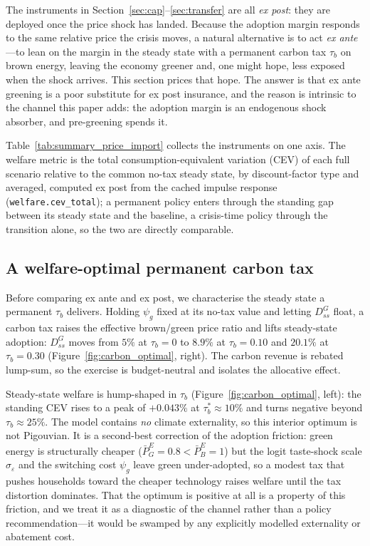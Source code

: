 \documentclass[11pt,a4paper]{article}
\begin{document}
The instruments in Section~\ref{sec:cap}--\ref{sec:transfer} are all
\emph{ex post}: they are deployed once the price shock has landed. Because the
adoption margin responds to the same relative price the crisis moves, a natural
alternative is to act \emph{ex ante}---to lean on the margin in the steady state
with a permanent carbon tax $\tau_b$ on brown energy, leaving the economy greener
and, one might hope, less exposed when the shock arrives. This section prices
that hope. The answer is that ex ante greening is a poor substitute for ex post
insurance, and the reason is intrinsic to the channel this paper adds: the
adoption margin is an endogenous shock absorber, and pre-greening spends it.

Table~\ref{tab:summary_price_import} collects the instruments on one axis. The
welfare metric is the total consumption-equivalent variation (CEV) of each full
scenario relative to the common no-tax steady state, by discount-factor type and
averaged, computed ex post from the cached impulse response
(\texttt{welfare.cev\_total}); a permanent policy enters through the standing gap
between its steady state and the baseline, a crisis-time policy through the
transition alone, so the two are directly comparable.



\subsection{A welfare-optimal permanent carbon tax}
\label{sec:carbontax}

Before comparing ex ante and ex post, we characterise the steady state a
permanent $\tau_b$ delivers. Holding $\psi_g$ fixed at its no-tax value and
letting $D^{G}_{ss}$ float, a carbon tax raises the effective brown/green price
ratio and lifts steady-state adoption: $D^{G}_{ss}$ moves from $5\%$ at
$\tau_b=0$ to $8.9\%$ at $\tau_b=0.10$ and $20.1\%$ at $\tau_b=0.30$
(Figure~\ref{fig:carbon_optimal}, right). The carbon revenue is rebated
lump-sum, so the exercise is budget-neutral and isolates the allocative effect.

Steady-state welfare is hump-shaped in $\tau_b$
(Figure~\ref{fig:carbon_optimal}, left): the standing CEV rises to a peak of
$+0.043\%$ at $\tau_b^{*}\approx 10\%$ and turns negative beyond
$\tau_b\approx 25\%$. The model contains \emph{no} climate externality, so this
interior optimum is not Pigouvian. It is a second-best correction of the
adoption friction: green energy is structurally cheaper
($\bar P^{E}_{G}=0.8<\bar P^{E}_{B}=1$) but the logit taste-shock scale
$\sigma_\varepsilon$ and the switching cost $\psi_g$ leave green under-adopted, so
a modest tax that pushes households toward the cheaper technology raises welfare
until the tax distortion dominates. That the optimum is positive at all is a
property of this friction, and we treat it as a diagnostic of the channel rather
than a policy recommendation---it would be swamped by any explicitly modelled
externality or abatement cost.
\end{document}
